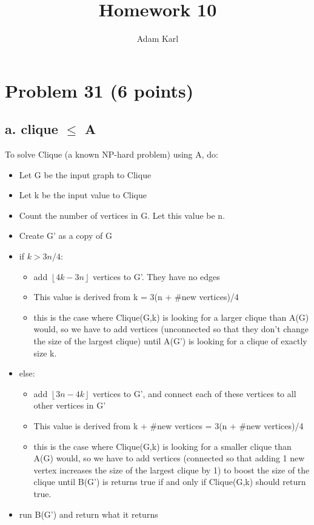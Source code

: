 \documentclass[a4paper]{article}
\title{Homework 10}
\author{Adam Karl}
\begin{document}
\maketitle

\section{Problem 31 (6 points)}
\subsection{a. clique $\leq$ A}
To solve Clique (a known NP-hard problem) using A, do:

\begin{itemize}
    \item Let G be the input graph to Clique
    \item Let k be the input value to Clique
    \item Count the number of vertices in G. Let this value be n.
    
    \item Create G' as a copy of G
    
    \item if $k > 3n/4$:
    \begin{itemize}
        \item add $\left\lfloor4k-3n\right\rfloor$ vertices to G'. They have no edges
        \item This value is derived from k = 3(n + #new vertices)/4
        \item this is the case where Clique(G,k) is looking for a larger clique than A(G) would, so we have to add vertices (unconnected so that they don't change the size of the largest clique) until A(G') is looking for a clique of exactly size k.
    \end{itemize}
    
    \item else:
    \begin{itemize}
        \item add $\left\lfloor3n-4k\right\rfloor$ vertices to G', and connect each of these vertices to all other vertices in G'
        \item This value is derived from k + #new vertices = 3(n + #new vertices)/4
        \item this is the case where Clique(G,k) is looking for a smaller clique than A(G) would, so we have to add vertices (connected so that adding 1 new vertex increases the size of the largest clique by 1) to boost the size of the clique until B(G') is returns true if and only if Clique(G,k) should return true.
    \end{itemize}
    \item run B(G') and return what it returns
\end{itemize}
\end{document}
